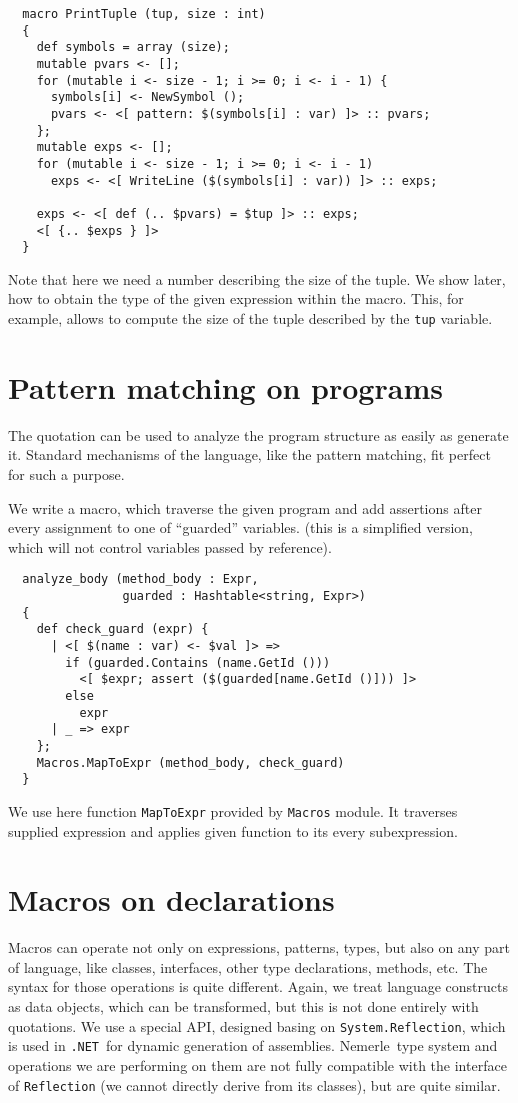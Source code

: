 \documentclass{llncs}
\newcommand{\net}[0]{{\tt .NET}}
\newcommand{\nem}[0]{Nemerle}
\begin{document}
\begin{verbatim}
  macro PrintTuple (tup, size : int)
  {
    def symbols = array (size);
    mutable pvars <- [];
    for (mutable i <- size - 1; i >= 0; i <- i - 1) {
      symbols[i] <- NewSymbol ();
      pvars <- <[ pattern: $(symbols[i] : var) ]> :: pvars;
    };
    mutable exps <- [];
    for (mutable i <- size - 1; i >= 0; i <- i - 1)
      exps <- <[ WriteLine ($(symbols[i] : var)) ]> :: exps;

    exps <- <[ def (.. $pvars) = $tup ]> :: exps;
    <[ {.. $exps } ]>
  }
\end{verbatim} %

Note that here we need a number describing the size of the tuple. We show later, 
how to obtain the type of the given expression within the macro. This, for 
example, allows to compute the size of the tuple described by the \verb,tup, variable.

\section{Pattern matching on programs}
The quotation can be used to analyze the program structure as easily as generate
it. Standard mechanisms of the language, like the pattern matching, fit perfect
for such a purpose. 

We write a macro, which traverse the given program and add assertions after every
assignment to one of ``guarded'' variables.
(this is a simplified version, which will not control variables passed by reference).
\begin{verbatim}
  analyze_body (method_body : Expr, 
                guarded : Hashtable<string, Expr>)
  {
    def check_guard (expr) {
      | <[ $(name : var) <- $val ]> =>
        if (guarded.Contains (name.GetId ()))
          <[ $expr; assert ($(guarded[name.GetId ()])) ]>
        else
          expr
      | _ => expr
    };
    Macros.MapToExpr (method_body, check_guard)
  }
\end{verbatim}

We use here function \verb,MapToExpr, provided by \verb,Macros, module. It
traverses supplied expression and applies given function to its every subexpression.

\section{Macros on declarations} \label{Declarations}
Macros can operate not only on expressions, patterns, types, but also on
any part of language, like classes, interfaces, other type declarations,
methods, etc. The syntax for those operations is quite different. Again, we
treat language constructs as data objects, which can be transformed, but
this is not done entirely with quotations. We use a special API, designed 
basing on \verb,System.Reflection,, which is used in \net\ for dynamic
generation of assemblies. \nem\ type system and operations we are performing
on them are not fully compatible with the interface of \verb,Reflection, 
(we cannot directly derive from its classes), but are quite similar.
\end{document}
